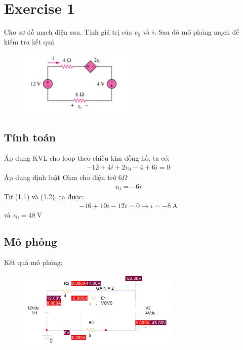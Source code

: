 \section{Exercise 1}
Cho sơ đồ mạch điện sau. Tính giá trị của $v_0$ và $i$. Sau đó mô phỏng mạch để kiểm tra kết quả
\begin{figure}[!htbp]
    \centering
    \includegraphics[width=0.5\textwidth]{graphics/ex1/f1.PNG}
    \caption{}
\end{figure}

\subsection{Tính toán}

Áp dụng KVL cho loop theo chiều kim đồng hồ, ta có:
\begin{align}
    -12 + 4i +2v_0 - 4 + 6i = 0
\end{align}
Áp dụng định luật Ohm cho điện trở $6 \Omega$
\begin{align}
    v_0 = -6i
\end{align}
Từ (1.1) và (1.2), ta được:
\begin{align*}
    -16 + 10i - 12i = 0 \rightarrow i = -8 \ \text{A}
\end{align*}
và \(v_0 = 48 \ \text{V}\)

\subsection{Mô phỏng}

Kết quả mô phỏng:

\begin{figure}[!htbp]
    \centering
    \includegraphics[width=0.7\textwidth]{graphics/ex1/f2.PNG}
\end{figure}